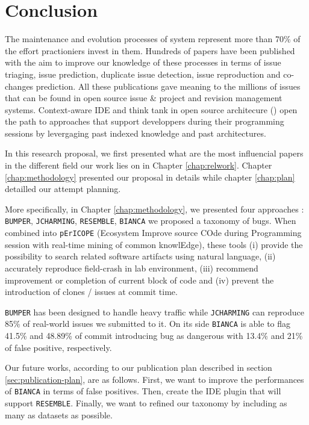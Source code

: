 
\chapter{Conclusion\label{chap:conclusion}}

The maintenance and evolution processes of system represent more than 70\% of the effort practioniers invest in them.
Hundreds of papers have been published with the aim to improve our knowledge of these processes in terms of issue triaging, issue prediction, duplicate issue detection, issue reproduction and co-changes prediction.
All these publications gave meaning to the millions of issues that can be found in open source issue \& project and revision management systems.
Context-aware IDE and think tank in open source architecure (\cite{chansler2011architecture}) open the path to approaches that support developpers during their programming sessions by levergaging past indexed knowledge and past architectures.

In this research proposal, we first presented what are the most influencial papers in the different field our work lies on in Chapter \ref{chap:relwork}. 
Chapter \ref{chap:methodology} presented our proposal in details while chapter \ref{chap:plan} detailled our attempt planning.

More specifically, in Chapter \ref{chap:methodology}, we presented four approaches : {\tt BUMPER}, {\tt JCHARMING}, {\tt RESEMBLE}, {\tt BIANCA} we proposed a taxonomy of bugs. When combined into {\tt pErICOPE} (Ecosystem Improve source COde during Programming session with real-time mining of common knowlEdge), these tools (i) provide the possibility to search related software artifacts using natural language, (ii) accurately reproduce field-crash in lab environment, (iii) recommend improvement or completion of current block of code and (iv) prevent the introduction of clones / issues at commit time.


{\tt BUMPER} has been designed to handle heavy traffic while {\tt JCHARMING} can reproduce 85\% of real-world issues we submitted to it. On its side {\tt BIANCA} is able to flag 41.5\% and 48.89\% of commit introducing bug as dangerous with 13.4\% and 21\% of false positive, respectively.

Our future works, according to our publication plan described in section \ref{sec:publication-plan}, are as follows. First, we want to improve the performances of {\tt BIANCA} in terms of false positives.
Then, create the IDE plugin that will support {\tt RESEMBLE}. Finally, we want to refined our taxonomy by including as many as datasets as possible.
